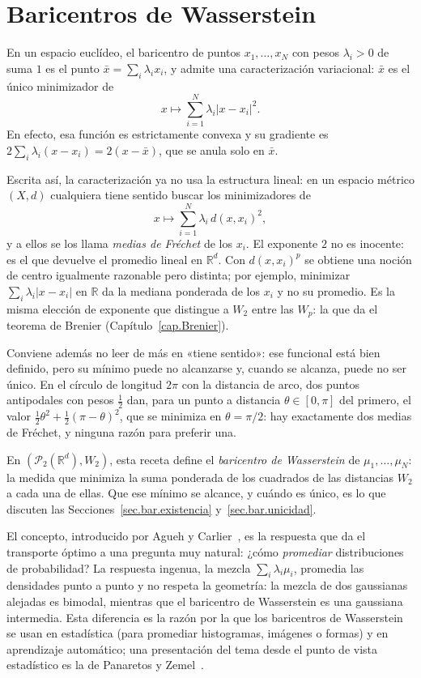 \documentclass[12pt, a4paper]{amsbook}
\newcommand{\R}{{\mathbb R}}
\theoremstyle{remark}
\theoremstyle{definition}
\numberwithin{section}{chapter}
\numberwithin{subsection}{section}
\numberwithin{equation}{section}
\numberwithin{figure}{chapter}
\begin{document}
\chapter{Baricentros de Wasserstein}\label{cap.baricentros}

En un espacio euclídeo, el baricentro de puntos $x_1,\dots,x_N$ con pesos
$\lambda_i>0$ de suma $1$ es el punto $\bar x=\sum_i\lambda_ix_i$, y admite
una caracterización variacional: $\bar x$ es el único minimizador de
\[
x\longmapsto\sum_{i=1}^N\lambda_i|x-x_i|^2.
\]
En efecto, esa función es estrictamente convexa y su gradiente es
$2\sum_i\lambda_i(x-x_i)=2(x-\bar x)$, que se anula solo en $\bar x$.

Escrita así, la caracterización ya no usa la estructura lineal: en un espacio
métrico $(X,d)$ cualquiera tiene sentido buscar los minimizadores de
\[
x\longmapsto\sum_{i=1}^N\lambda_i\,d(x,x_i)^2,
\]
y a ellos se los llama \emph{medias de Fréchet} de los $x_i$. El exponente
$2$ no es inocente: es el que devuelve el promedio lineal en $\R^d$. Con
$d(x,x_i)^p$ se obtiene una noción de centro igualmente razonable pero
distinta; por ejemplo, minimizar $\sum_i\lambda_i|x-x_i|$ en $\R$ da la
mediana ponderada de los $x_i$ y no su promedio. Es la misma elección de
exponente que distingue a $W_2$ entre las $W_p$: la que da el teorema de
Brenier (Capítulo~\ref{cap.Brenier}).

Conviene además no leer de más en «tiene sentido»: ese funcional
está bien definido, pero su mínimo puede no
alcanzarse y, cuando se alcanza, puede no ser único. En el círculo de
longitud $2\pi$ con la distancia de arco, dos puntos antipodales con pesos
$\tfrac12$ dan, para un punto a distancia $\theta\in[0,\pi]$ del primero,
el valor $\tfrac12\theta^2+\tfrac12(\pi-\theta)^2$, que se minimiza en
$\theta=\pi/2$: hay exactamente dos medias de Fréchet, y ninguna razón para
preferir una.

En $(\mathcal P_2(\R^d),W_2)$, esta receta define el
\emph{baricentro de Wasserstein} de $\mu_1,\dots,\mu_N$: la medida que
minimiza la suma ponderada de los cuadrados de las distancias $W_2$ a cada
una de ellas. Que ese mínimo se alcance, y cuándo es único, es lo que
discuten las Secciones~\ref{sec.bar.existencia}
y~\ref{sec.bar.unicidad}.

El concepto, introducido por Agueh y Carlier~\cite{AguehCarlier2011}, es la
respuesta que da el transporte óptimo a una pregunta muy natural: ¿cómo
\emph{promediar} distribuciones de probabilidad? La respuesta ingenua, la
mezcla $\sum_i\lambda_i\mu_i$, promedia las densidades punto a punto y no
respeta la geometría: la mezcla de dos gaussianas alejadas es bimodal, mientras
que el baricentro de Wasserstein es una gaussiana intermedia. Esta diferencia
es la razón por la que los baricentros de Wasserstein se usan en estadística
(para promediar histogramas, imágenes o formas) y en aprendizaje automático;
una presentación del tema desde el punto de vista estadístico es la de
Panaretos y Zemel~\cite{PanaretosZemel}.
\end{document}
